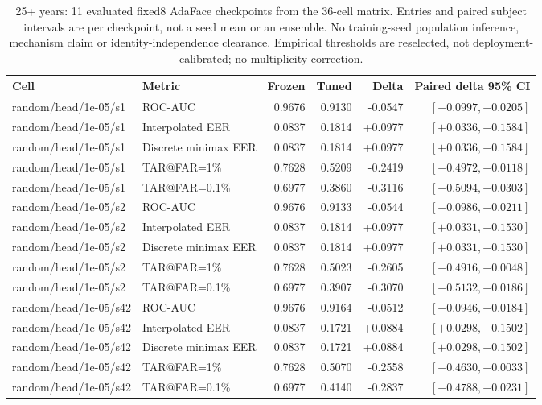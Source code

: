 \documentclass[journal]{IEEEtran}
\begin{document}
\clearpage
\begin{table}[!t]
\caption{25+ years: 11 evaluated fixed8 AdaFace checkpoints from the 36-cell matrix. Entries and paired subject intervals are per checkpoint, not a seed mean or an ensemble. No training-seed population inference, mechanism claim or identity-independence clearance. Empirical thresholds are reselected, not deployment-calibrated; no multiplicity correction.}
\label{tab:strong-fixed8-large-gap-25plus}
\centering\scriptsize
\begin{tabular}{@{}llrrrr@{}}
\toprule
Cell & Metric & Frozen & Tuned & Delta & Paired delta 95\% CI \\
\midrule
random/head/1e-05/s1 & ROC-AUC & 0.9676 & 0.9130 & -0.0547 & $[-0.0997,-0.0205]$ \\
random/head/1e-05/s1 & Interpolated EER & 0.0837 & 0.1814 & +0.0977 & $[+0.0336,+0.1584]$ \\
random/head/1e-05/s1 & Discrete minimax EER & 0.0837 & 0.1814 & +0.0977 & $[+0.0336,+0.1584]$ \\
random/head/1e-05/s1 & TAR@FAR=1\% & 0.7628 & 0.5209 & -0.2419 & $[-0.4972,-0.0118]$ \\
random/head/1e-05/s1 & TAR@FAR=0.1\% & 0.6977 & 0.3860 & -0.3116 & $[-0.5094,-0.0303]$ \\
random/head/1e-05/s2 & ROC-AUC & 0.9676 & 0.9133 & -0.0544 & $[-0.0986,-0.0211]$ \\
random/head/1e-05/s2 & Interpolated EER & 0.0837 & 0.1814 & +0.0977 & $[+0.0331,+0.1530]$ \\
random/head/1e-05/s2 & Discrete minimax EER & 0.0837 & 0.1814 & +0.0977 & $[+0.0331,+0.1530]$ \\
random/head/1e-05/s2 & TAR@FAR=1\% & 0.7628 & 0.5023 & -0.2605 & $[-0.4916,+0.0048]$ \\
random/head/1e-05/s2 & TAR@FAR=0.1\% & 0.6977 & 0.3907 & -0.3070 & $[-0.5132,-0.0186]$ \\
random/head/1e-05/s42 & ROC-AUC & 0.9676 & 0.9164 & -0.0512 & $[-0.0946,-0.0184]$ \\
random/head/1e-05/s42 & Interpolated EER & 0.0837 & 0.1721 & +0.0884 & $[+0.0298,+0.1502]$ \\
random/head/1e-05/s42 & Discrete minimax EER & 0.0837 & 0.1721 & +0.0884 & $[+0.0298,+0.1502]$ \\
random/head/1e-05/s42 & TAR@FAR=1\% & 0.7628 & 0.5070 & -0.2558 & $[-0.4630,-0.0033]$ \\
random/head/1e-05/s42 & TAR@FAR=0.1\% & 0.6977 & 0.4140 & -0.2837 & $[-0.4788,-0.0231]$ \\

\end{tabular}
\end{table}
\end{document}
